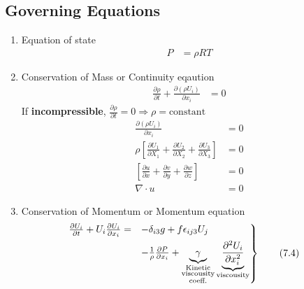 \documentclass[fleqn,10pt]{SelfArx} %
\begin{document}
\subsection{Governing Equations}
\begin{enumerate}[noitemsep]
	\item Equation of state
	      \begin{align*}
		      P & = \rho RT \tag{7.1} \label{eq:idealgaeq}
	      \end{align*}
	\item Conservation of Mass or Continuity eqaution
	      \begin{align*}
		      \frac{\partial \rho}{\partial t} + \frac{\partial \left(\rho U_i\right)}{\partial x_i} & = 0 \tag{7.2} \label{eq:continuityeq}
	      \end{align*}
	      If \textbf{incompressible}, $\frac{\partial \rho}{\partial t} = 0 \Rightarrow \rho = \text{constant}$
	      \begin{align*}
		      \frac{\partial \left(\rho U_i\right)}{\partial x_i}                                                                        & = 0                                 \\
		      \rho\left[\frac{\partial U_1}{\partial X_1} + \frac{\partial U_2}{\partial X_2} + \frac{\partial U_3}{\partial X_3}\right] & = 0                                 \\
		      \left[\frac{\partial u}{\partial x} + \frac{\partial v}{\partial y} + \frac{\partial w}{\partial z}\right]                 & = 0                                 \\
		      \nabla \cdot u                                                                                                             & = 0 \tag{7.3} \label{eq:idealgaeq1}
	      \end{align*}
	\item Conservation of Momentum or Momentum equation
	      \begin{align*}
		      \begin{rcases}
			    \mspace{-20mu} \frac{\partial U_i}{\partial t} + U_i\frac{\partial U_i}{\partial x_i} = & -\delta_{i3}g + f\epsilon_{ij3}U_j \\ &- \frac{1}{\rho}\frac{\partial P}{\partial x_i} + \underbrace{\gamma}_{\substack{\text{Kinetic} \\ \text{viscousity} \\ \text{coeff.}}}\underbrace{\frac{\partial^2 U_i}{\partial x_i^2}}_{\text{viscousity}}
		      \end{rcases} \tag{7.4} \label{eq:momentumeq}

\end{align*}
\end{enumerate}
\end{document}
